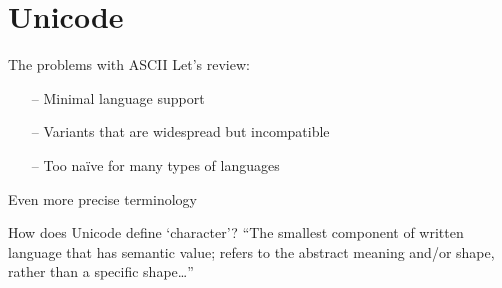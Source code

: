 \documentclass[../index.tex]{subfiles}
\begin{document}
\renewcommand{\sectiontitle}{Unicode}
\section{\sectiontitle}
%

\renewcommand{\currenttitle}{The problems with ASCII}
\begin{frame}{\currenttitle}
%
%
%
  Let's review: \\

  \begin{itemize}
    \item[--] Minimal language support
    \item[--] Variants that are widespread but incompatible
    \item[--] Too naïve for many types of languages
  \end{itemize}
\end{frame}

\renewcommand{\currenttitle}{Even more precise terminology}
\begin{frame}{\currenttitle}
\end{frame}

\renewcommand{\currenttitle}{How does Unicode define `character'?}
\begin{frame}{\currenttitle}
  ``The smallest component of written language that has semantic value; refers to the
    abstract meaning and/or shape, rather than a specific shape\ldots''
\end{frame}
\end{document}
